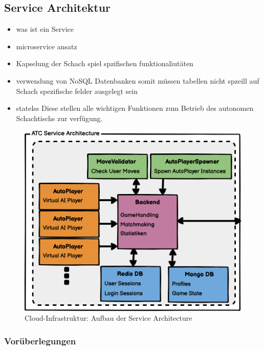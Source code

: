 \hypertarget{service-architektur}{%
\subsection{Service Architektur}\label{service-architektur}}

\begin{itemize}
\tightlist
\item
  was ist ein Service
\item
  microservice ansatz
\item
  Kapselung der Schach spiel spzifischen funktionaliutäten
\item
  verwendung von NoSQL Datenbanken somit müssen tabellen nicht spzeill
  auf Schach spezifische felder ausgelegt sein
\item
  statelss Diese stellen alle wichtigen Funktionen zum Betrieb des
  autonomen Schachtischs zur verfügung.
\end{itemize}

\begin{figure}
\centering
\includegraphics{images/ATC_Service_Architecture.png}
\caption{Cloud-Infrastruktur: Aufbau der Service Architecture
\label{ATC_Service_Architecture}}
\end{figure}

\hypertarget{voruxfcberlegungen}{%
\subsubsection{Vorüberlegungen}\label{voruxfcberlegungen}}

